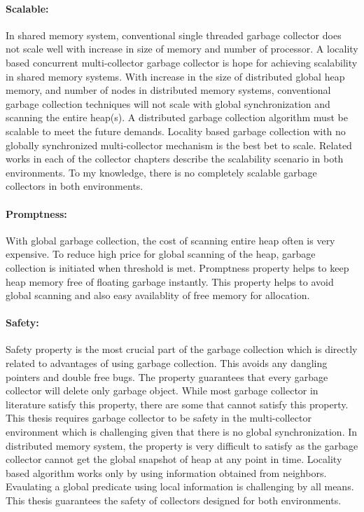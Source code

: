 \paragraph{Scalable:}
	In shared memory system, conventional single threaded garbage collector does not scale well with increase in size of memory and number of processor. A locality based concurrent multi-collector garbage collector is hope for achieving scalability in shared memory systems.
	With increase in the size of distributed global heap memory, and  number of nodes in distributed memory systems, conventional garbage collection techniques will not scale with global synchronization and scanning the entire heap(s). A distributed garbage collection algorithm must be scalable to meet the future demands. Locality based garbage collection with no globally synchronized multi-collector mechanism is the best bet to scale. Related works in each of the collector chapters describe the scalability scenario in both environments. To my knowledge, there is no completely scalable garbage collectors in both environments.
\paragraph{Promptness:}
	With global garbage collection, the cost of scanning entire heap often is very expensive. To reduce high price for global scanning of the heap, garbage collection is initiated when threshold is met. Promptness property helps to keep heap memory free of floating garbage instantly. This property helps to avoid global scanning and also easy availablity of free memory for allocation.
\paragraph{Safety:}
	Safety property is the most crucial part of the garbage collection which is directly related to advantages of using garbage collection. This avoids any dangling pointers and double free bugs. The property guarantees that every garbage collector will delete only garbage object. While most garbage collector in literature satisfy this property, there are some that cannot satisfy this property. This thesis requires garbage collector to be safety in the multi-collector environment which is challenging given that there is no global synchronization. In distributed memory system, the property is very difficult to satisfy as the garbage collector cannot get the global snapshot of heap at any point in time. Locality based algorithm works only by using information obtained from neighbors. Evaulating a global predicate using local information is challenging by all means. This thesis guarantees the safety of collectors designed for both environments.
